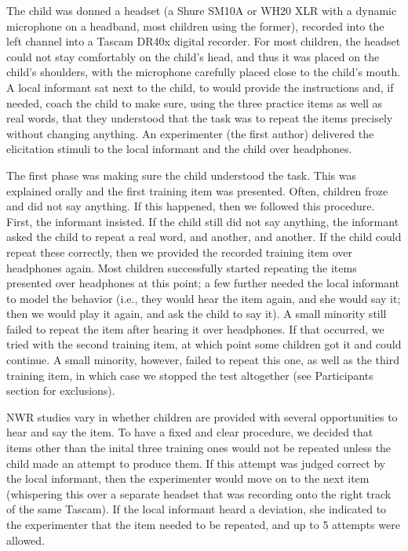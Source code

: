 \documentclass[english,,man,floatsintext]{apa6}
\begin{document}
The child was donned a headset (a Shure SM10A or WH20 XLR with a dynamic
microphone on a headband, most children using the former), recorded into
the left channel into a Tascam DR40x digital recorder. For most
children, the headset could not stay comfortably on the child's head,
and thus it was placed on the child's shoulders, with the microphone
carefully placed close to the child's mouth. A local informant sat next
to the child, to would provide the instructions and, if needed, coach
the child to make sure, using the three practice items as well as real
words, that they understood that the task was to repeat the items
precisely without changing anything. An experimenter (the first author)
delivered the elicitation stimuli to the local informant and the child
over headphones.

The first phase was making sure the child understood the task. This was
explained orally and the first training item was presented. Often,
children froze and did not say anything. If this happened, then we
followed this procedure. First, the informant insisted. If the child
still did not say anything, the informant asked the child to repeat a
real word, and another, and another. If the child could repeat these
correctly, then we provided the recorded training item over headphones
again. Most children successfully started repeating the items presented
over headphones at this point; a few further needed the local informant
to model the behavior (i.e., they would hear the item again, and she
would say it; then we would play it again, and ask the child to say it).
A small minority still failed to repeat the item after hearing it over
headphones. If that occurred, we tried with the second training item, at
which point some children got it and could continue. A small minority,
however, failed to repeat this one, as well as the third training item,
in which case we stopped the test altogether (see Participants section
for exclusions).

NWR studies vary in whether children are provided with several
opportunities to hear and say the item. To have a fixed and clear
procedure, we decided that items other than the inital three training
ones would not be repeated unless the child made an attempt to produce
them. If this attempt was judged correct by the local informant, then
the experimenter would move on to the next item (whispering this over a
separate headset that was recording onto the right track of the same
Tascam). If the local informant heard a deviation, she indicated to the
experimenter that the item needed to be repeated, and up to 5 attempts
were allowed.
\end{document}
